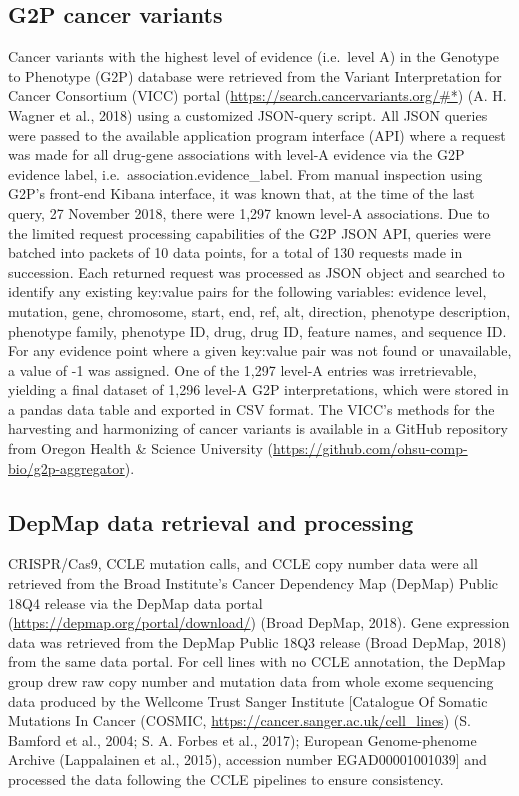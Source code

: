 \documentclass[man,floatsintext]{apa6}
\begin{document}
\subsection{G2P cancer variants}\label{g2p-cancer-variants}

Cancer variants with the highest level of evidence (i.e.~level A) in the
Genotype to Phenotype (G2P) database were retrieved from the Variant
Interpretation for Cancer Consortium (VICC) portal
(\url{https://search.cancervariants.org/\#*}) (A. H. Wagner et al.,
2018) using a customized JSON-query script. All JSON queries were passed
to the available application program interface (API) where a request was
made for all drug-gene associations with level-A evidence via the G2P
evidence label, i.e.~association.evidence\_label. From manual inspection
using G2P's front-end Kibana interface, it was known that, at the time
of the last query, 27 November 2018, there were 1,297 known level-A
associations. Due to the limited request processing capabilities of the
G2P JSON API, queries were batched into packets of 10 data points, for a
total of 130 requests made in succession. Each returned request was
processed as JSON object and searched to identify any existing key:value
pairs for the following variables: evidence level, mutation, gene,
chromosome, start, end, ref, alt, direction, phenotype description,
phenotype family, phenotype ID, drug, drug ID, feature names, and
sequence ID. For any evidence point where a given key:value pair was not
found or unavailable, a value of -1 was assigned. One of the 1,297
level-A entries was irretrievable, yielding a final dataset of 1,296
level-A G2P interpretations, which were stored in a pandas data table
and exported in CSV format. The VICC's methods for the harvesting and
harmonizing of cancer variants is available in a GitHub repository from
Oregon Health \& Science University
(\url{https://github.com/ohsu-comp-bio/g2p-aggregator}).

\subsection{DepMap data retrieval and
processing}\label{depmap-data-retrieval-and-processing}

CRISPR/Cas9, CCLE mutation calls, and CCLE copy number data were all
retrieved from the Broad Institute's Cancer Dependency Map (DepMap)
Public 18Q4 release via the DepMap data portal
(\url{https://depmap.org/portal/download/}) (Broad DepMap, 2018). Gene
expression data was retrieved from the DepMap Public 18Q3 release (Broad
DepMap, 2018) from the same data portal. For cell lines with no CCLE
annotation, the DepMap group drew raw copy number and mutation data from
whole exome sequencing data produced by the Wellcome Trust Sanger
Institute {[}Catalogue Of Somatic Mutations In Cancer (COSMIC,
\url{https://cancer.sanger.ac.uk/cell_lines}) (S. Bamford et al., 2004;
S. A. Forbes et al., 2017); European Genome-phenome Archive (Lappalainen
et al., 2015), accession number EGAD00001001039{]} and processed the
data following the CCLE pipelines to ensure consistency.
\end{document}
